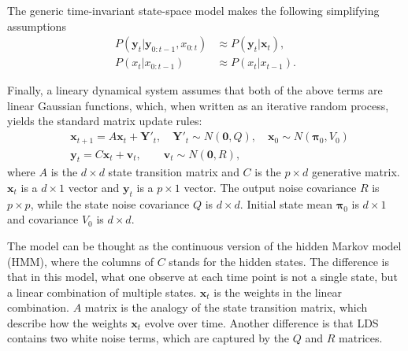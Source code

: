 \documentclass[fleqn,12pt]{article}
\providecommand{\mb}[1]{\boldsymbol{#1}}
\newcommand{\bx}{\mb{x}}
\newcommand{\by}{\mb{y}}
\newcommand{\bX}{\mb{X}}
\newcommand{\bY}{\mb{Y}}
\begin{document}
The generic time-invariant state-space model makes the following simplifying assumptions
\begin{equation}
\begin{aligned}
P(\by_t | \by_{0:t-1}, x_{0:t})  &\approx P(\by_t | \bx_t), \\
P(x_t | x_{0:t-1}) &\approx P(x_t | x_{t-1}).
\end{aligned}
\end{equation}

Finally, a lineary dynamical system assumes that both of the above terms are linear Gaussian functions, which, when written as an iterative random process, yields the standard matrix update rules:
\begin{equation} \label{eq:model}
\begin{aligned}
&\bx_{t+1}=A\bx_t+\bY'_t, \quad \bY'_t\sim N(\mathbf{0},Q),\quad \bx_0 \sim N(\mathbf{\pi}_0,V_0)\\
&\by_t=C\bx_t+\mathbf{v}_t,\qquad \mathbf{v}_t\sim N(\mathbf{0},R),
\end{aligned}
\end{equation}
where $A$ is the $d\times d$ state transition matrix and $C$ is the $p \times d$ generative matrix. $\bx_t$ is a $d\times 1$ vector and $\by_t$ is a $p\times 1$ vector.
The output noise covariance $R$ is $p\times p$, while the state noise covariance $Q$ is $d\times d$. Initial state mean $\mathbf{\pi}_0$ is $d\times 1$ and covariance $V_0$ is $d \times d$.

The model can be thought as the continuous version of the hidden Markov model (HMM), where the columns of $C$ stands for the hidden states. The difference is that in this model, what one observe at each time point is not a single state, but a linear combination of multiple states. $\bx_t$ is the weights in the linear combination. $A$ matrix is the analogy of the state transition matrix, which describe how the weights $\bx_t$ evolve over time. Another difference is that LDS contains two white noise terms, which are captured by the $Q$ and $R$ matrices.
\end{document}
